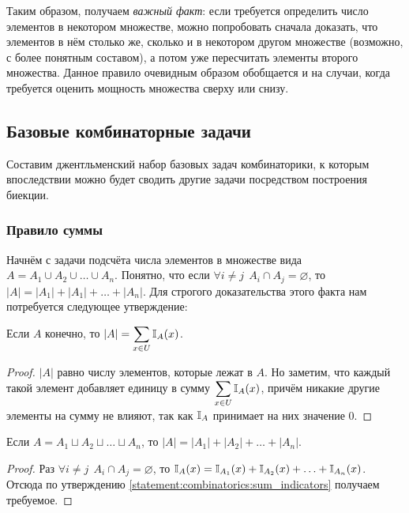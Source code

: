 Таким образом, получаем \emph{важный факт}: если требуется определить число элементов в некотором множестве,
можно попробовать сначала доказать, что элементов в нём столько же, сколько и в некотором другом множестве (возможно, с более понятным составом),
а потом уже пересчитать элементы второго множества.
Данное правило очевидным образом обобщается и на случаи, когда требуется оценить мощность множества сверху или снизу.


\subsection{Базовые комбинаторные задачи}
\label{subsec:combinatorics:basics}

Составим джентльменский набор базовых задач комбинаторики, к которым впоследствии можно будет сводить другие задачи посредством построения биекции.


\subsubsection{Правило суммы}

Начнём с задачи подсчёта числа элементов в множестве вида $ A = A_1 \cup A_2 \cup \ldots \cup A_n $.
Понятно, что если $ \forall i \neq j \;\, A_i \cap A_j = \varnothing $, то $ |A| = |A_1| + |A_1| + \ldots + |A_n| $.
Для строгого доказательства этого факта нам потребуется следующее утверждение:

\begin{statement}
    \label{statement:combinatorics:sum_indicators}
    Если $ A $ конечно, то $ \displaystyle |A| = \sum_{x \in U} \mathbb{I}_A(x) $.
\end{statement}

\begin{proof}
    $ |A| $ равно числу элементов, которые лежат в $ A $.
    Но заметим, что каждый такой элемент добавляет единицу в сумму $ \displaystyle \sum_{x \in U} \mathbb{I}_A(x) $,
    причём никакие другие элементы на сумму не влияют, так как $ \mathbb{I}_A $ принимает на них значение $ 0 $.
\end{proof}

\begin{corollary}
    Если $ A = A_1 \sqcup A_2 \sqcup \ldots \sqcup A_n $, то $ |A| = |A_1| + |A_2| + \ldots + |A_n| $.
\end{corollary}

\begin{proof}
    Раз $ \forall i \neq j \;\, A_i \cap A_j = \varnothing $, то $ \mathbb{I}_A(x) = \mathbb{I}_{A_1}(x) + \mathbb{I}_{A_2}(x) + \ldots + \mathbb{I}_{A_n}(x) $.
    Отсюда по утверждению \ref{statement:combinatorics:sum_indicators} получаем требуемое.
\end{proof}

